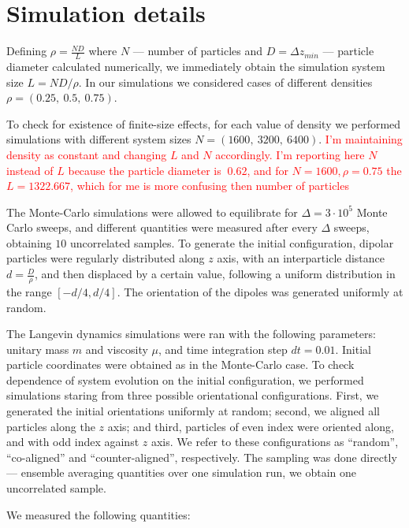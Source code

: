 \section{Simulation details}
\label{sec:simulation_details}

Defining $\rho = \frac{N D}{L}$ where $N$ --- number of particles and $D = \Delta z_{min}$ --- particle diameter calculated numerically, we immediately obtain the simulation system size $L = N D/ \rho$. In our simulations we considered cases of different densities $\rho = (0.25,\ 0.5,\ 0.75)$.

To check for existence of finite-size effects, for each value of density we performed simulations with different system sizes $N = (1600,\ 3200,\ 6400)$. \textcolor{red}{I'm maintaining density as constant and changing $L$ and $N$ accordingly. I'm reporting here $N$ instead of $L$ because the particle diameter is $~0.62$, and for $N = 1600, \rho = 0.75$ the $L = 1322.667$, which for me is more confusing then number of particles}

The Monte-Carlo simulations were allowed to equilibrate for $\Delta = 3 \cdot 10^5$ Monte Carlo sweeps, and different quantities were measured after every $\Delta$ sweeps, obtaining $10$ uncorrelated samples. To generate the initial configuration, dipolar particles were regularly distributed along $z$ axis, with an interparticle distance $d = \frac{D}{\rho}$, and then displaced by a certain value, following a uniform distribution in the range $[-d/4, d/4]$. The orientation of the dipoles was generated uniformly at random.

The Langevin dynamics simulations were ran with the following parameters: unitary mass $m$ and viscosity $\mu$, and time integration step $d t = 0.01$. Initial particle coordinates were obtained as in the Monte-Carlo case. To check dependence of system evolution on the initial configuration, we performed simulations staring from three possible orientational configurations. First, we generated the initial orientations uniformly at random; second,  we aligned all particles along the $z$ axis; and third, particles of even index were oriented along, and with odd index against $z$ axis. We refer to these configurations as ``random'', ``co-aligned'' and ``counter-aligned'', respectively. The sampling was done directly --- ensemble averaging quantities over one simulation run, we obtain one uncorrelated sample.

We measured the following quantities:

